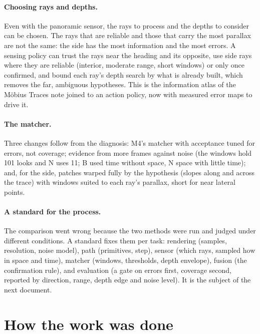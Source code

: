 \documentclass[11pt,a4paper]{article}
\begin{document}
\paragraph{Choosing rays and depths.} Even with the panoramic sensor, the rays to process and the depths to consider can be
chosen. The rays that are reliable and those that carry the most parallax are not the same: the side has the most
information and the most errors. A sensing policy can trust the rays near the heading and its opposite, use side rays where
they are reliable (interior, moderate range, short windows) or only once confirmed, and bound each ray's depth search by
what is already built, which removes the far, ambiguous hypotheses. This is the information atlas of the M\"obius Traces note joined
to an action policy, now with measured error maps to drive it.

\paragraph{The matcher.} Three changes follow from the diagnosis: M4's matcher with acceptance tuned for errors, not
coverage; evidence from more frames against noise (the windows hold 101 looks and N uses 11; B used time without space, N
space with little time); and, for the side, patches warped fully by the hypothesis (slopes along and across the trace) with
windows suited to each ray's parallax, short for near lateral points.

\paragraph{A standard for the process.} The comparison went wrong because the two methods were run and judged under
different conditions. A standard fixes them per task: rendering (samples, resolution, noise model), path (primitives,
step), sensor (which rays, sampled how in space and time), matcher (windows, thresholds, depth envelope), fusion (the
confirmation rule), and evaluation (a gate on errors first, coverage second, reported by direction, range, depth edge and
noise level). It is the subject of the next document.

\section{How the work was done}\label{sec:process}
\end{document}
